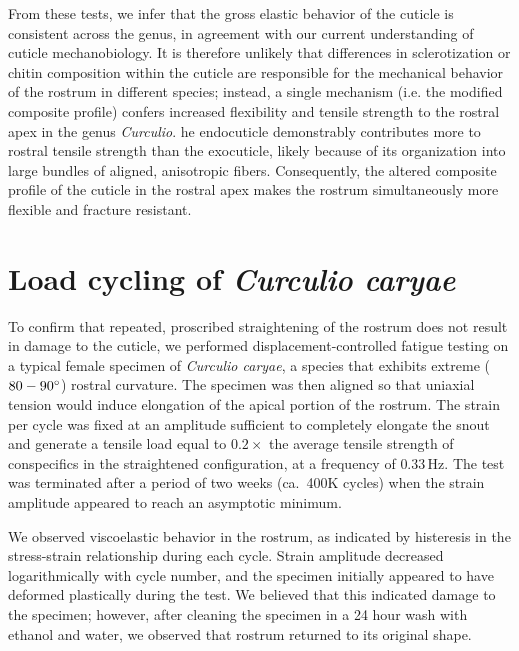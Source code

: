 \documentclass[twocolumn, linenumbers, superscriptaddress, nofootinbib]{revtex4-1}
\begin{document}
		From these tests, we infer that the gross elastic behavior of the cuticle is consistent across the genus, in agreement with our current understanding of cuticle mechanobiology.
		It is therefore unlikely that differences in sclerotization or chitin composition within the cuticle are responsible for the mechanical behavior of the rostrum in different species; instead, a single mechanism (i.e. the modified composite profile) confers increased flexibility and tensile strength to the rostral apex in the genus \textit{Curculio}.
		he endocuticle demonstrably contributes more to rostral tensile strength than the exocuticle, likely because of its organization into large bundles of aligned, anisotropic fibers.
		Consequently, the altered composite profile of the cuticle in the rostral apex makes the rostrum simultaneously more flexible and fracture resistant.
	
	\section{Load cycling of \textit{Curculio caryae}}
		To confirm that repeated, proscribed straightening of the rostrum does not result in damage to the cuticle, we performed displacement-controlled fatigue testing on a typical female specimen of \textit{Curculio caryae}, a species that exhibits extreme ($80-90\degree$) rostral curvature.
		The specimen was then aligned so that uniaxial tension would induce elongation of the apical portion of the rostrum.
		The strain per cycle was fixed at an amplitude sufficient to completely elongate the snout and generate a tensile load equal to $0.2\times$ the average tensile strength of conspecifics in the straightened configuration, at a frequency of $0.33\,\text{Hz}$.
		The test was terminated after a period of two weeks (ca.~400K cycles) when the strain amplitude appeared to reach an asymptotic minimum.		
		
		We observed viscoelastic behavior in the rostrum, as indicated by histeresis in the stress-strain relationship during each cycle.
		Strain amplitude decreased logarithmically with cycle number, and the specimen initially appeared to have deformed plastically during the test.
		We believed that this indicated damage to the specimen; however, after cleaning the specimen in a 24 hour wash with ethanol and water, we observed that rostrum returned to its original shape.
		
\end{document}
